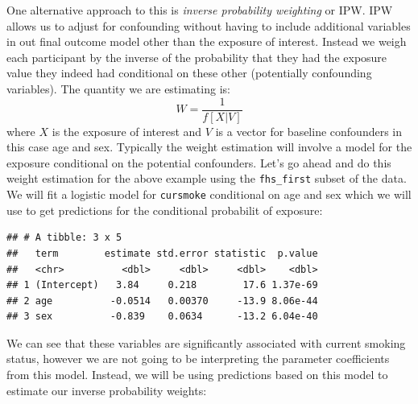\documentclass[
]{book}
\newenvironment{Shaded}{\begin{snugshade}}{\end{snugshade}}
\newcommand{\DataTypeTok}[1]{\textcolor[rgb]{0.13,0.29,0.53}{#1}}
\newcommand{\KeywordTok}[1]{\textcolor[rgb]{0.13,0.29,0.53}{\textbf{#1}}}
\newcommand{\NormalTok}[1]{#1}
\newcommand{\OperatorTok}[1]{\textcolor[rgb]{0.81,0.36,0.00}{\textbf{#1}}}
\newcommand{\StringTok}[1]{\textcolor[rgb]{0.31,0.60,0.02}{#1}}
\begin{document}
One alternative approach to this is \emph{inverse probability weighting} or IPW. IPW allows us to adjust for confounding without having to include additional variables in out final outcome model other than the exposure of interest. Instead we weigh each participant by the inverse of the probability that they had the exposure value they indeed had conditional on these other (potentially confounding variables). The quantity we are estimating is:
\[
W=\frac{1}{f[X|V]}
\]
where \(X\) is the exposure of interest and \(V\) is a vector for baseline confounders in this case age and sex.
Typically the weight estimation will involve a model for the exposure conditional on the potential confounders. Let's go ahead and do this weight estimation for the above example using the \texttt{fhs\_first} subset of the data. We will fit a logistic model for \texttt{cursmoke} conditional on age and sex which we will use to get predictions for the conditional probabilit of exposure:

\begin{Shaded}
\end{Shaded}

\begin{verbatim}
## # A tibble: 3 x 5
##   term        estimate std.error statistic  p.value
##   <chr>          <dbl>     <dbl>     <dbl>    <dbl>
## 1 (Intercept)   3.84     0.218        17.6 1.37e-69
## 2 age          -0.0514   0.00370     -13.9 8.06e-44
## 3 sex          -0.839    0.0634      -13.2 6.04e-40
\end{verbatim}

We can see that these variables are significantly associated with current smoking status, however we are not going to be interpreting the parameter coefficients from this model. Instead, we will be using predictions based on this model to estimate our inverse probability weights:
\end{document}
